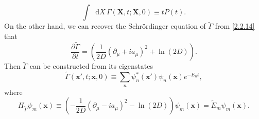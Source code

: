 \documentclass[10pt,nofootinbib]{revtex4}
\newcommand*\dd{\mathop{}\!\mathrm{d}}
\numberwithin{equation}{section}
\begin{document}
		\begin{equation}\label{2.2.15}
			\int\dd X\,\Gamma(\bm{X},t;\bm{X},0)\equiv tP(t).
		\end{equation}
		On the other hand, we can recover the Schr\"{o}rdinger equation of $\widetilde{\Gamma}$ from \eqref{2.2.14} that
		\begin{equation}\label{2.2.16}
			\dfrac{\partial\widetilde{\Gamma}}{\partial t}=\left(\dfrac{1}{2D}(\partial_\mu+ia_\mu)^2+\ln(2D)\right).
		\end{equation}
		Then $\widetilde{\Gamma}$ can be constructed from its eigenstates
		\begin{equation*}
			\widetilde{\Gamma}(\bm{x'},t;\bm{x},0)\equiv\sum_{n}\psi_n^*(\bm{x'})\psi_n(\bm{x})e^{-E_nt},
		\end{equation*}
		where
		\begin{equation*}
			H_{\widetilde{\Gamma}}\psi_m(\bm{x})\equiv\left(-\dfrac{1}{2D}(\partial_\mu-ia_\mu)^2-\ln(2D)\right)\psi_m(\bm{x})=\widetilde{E}_m\psi_m(\bm{x}).
		\end{equation*}
		
\end{document}
